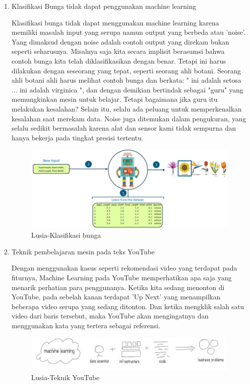 \begin{enumerate}
\item Klasifikasi Bunga tidak dapat penggunakan machine learning
	\par Klasifikasi bunga tidak dapat menggunakan machine learning karena memiliki masalah input yang serupa namun output yang berbeda atau 'noise'. Yang dimaksud dengan noise adalah contoh output yang direkam bukan seperti seharusnya. Misalnya saja kita secara implisit berasumsi bahwa contoh bunga kita telah diklasifikasikan dengan benar. Tetapi ini harus dilakukan dengan seseorang yang tepat, seperti seorang ahli botani. Seorang ahli botani ahli harus melihat contoh bunga dan berkata: " ini adalah setosa ... ini adalah virginica ", dan dengan demikian bertindak sebagai "guru" yang memungkinkan mesin untuk belajar. Tetapi bagaimana jika guru itu melakukan kesalahan? Selain itu, selalu ada peluang untuk memperkenalkan kesalahan saat merekam data. Noise juga ditemukan dalam pengukuran, yang selalu sedikit bermasalah karena alat dan sensor kami tidak sempurna dan hanya bekerja pada tingkat presisi tertentu.
	\begin{figure}[ht]
		\centering
		\includegraphics[scale=0.5]{figures/m2.jpg}
		\caption{Lusia-Klasifikasi bunga}
		\label{contoh}
	\end{figure}

\item Teknik pembelajaran mesin pada teks YouTube
	\par Dengan menggunakan kasus seperti rekomendasi video yang terdapat pada fiturnya, Machine Learning pada YouTube memperhatikan apa saja yang menarik perhatian para penggunanya. Ketika kita sedang menonton di YouTube, pada sebelah kanan terdapat 'Up Next' yang menampilkan beberapa video serupa yang sedang ditonton. Dan ketika mengklik salah satu video dari baris tersebut, maka YouTube akan mengingatnya dan menggunakan kata yang tertera sebagai referensi. 
	\begin{figure}[ht]
		\centering
		\includegraphics[scale=0.5]{figures/m3.jpg}
		\caption{Lusia-Teknik YouTube}
		\label{contoh}
	\end{figure}


\end{enumerate}
